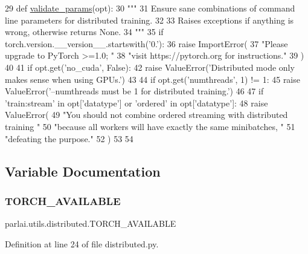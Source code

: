 \begin{DoxyCode}
29 \textcolor{keyword}{def }\hyperlink{namespaceparlai_1_1utils_1_1distributed_afd854992e4cc6571b120b9e179cd4a7a}{validate\_params}(opt):
30     \textcolor{stringliteral}{"""}
31 \textcolor{stringliteral}{    Ensure sane combinations of command line parameters for distributed training.}
32 \textcolor{stringliteral}{}
33 \textcolor{stringliteral}{    Raises exceptions if anything is wrong, otherwise returns None.}
34 \textcolor{stringliteral}{    """}
35     \textcolor{keywordflow}{if} torch.version.\_\_version\_\_.startswith(\textcolor{stringliteral}{'0.'}):
36         \textcolor{keywordflow}{raise} ImportError(
37             \textcolor{stringliteral}{"Please upgrade to PyTorch >=1.0; "}
38             \textcolor{stringliteral}{"visit https://pytorch.org for instructions."}
39         )
40 
41     \textcolor{keywordflow}{if} opt.get(\textcolor{stringliteral}{'no\_cuda'}, \textcolor{keyword}{False}):
42         \textcolor{keywordflow}{raise} ValueError(\textcolor{stringliteral}{'Distributed mode only makes sense when using GPUs.'})
43 
44     \textcolor{keywordflow}{if} opt.get(\textcolor{stringliteral}{'numthreads'}, 1) != 1:
45         \textcolor{keywordflow}{raise} ValueError(\textcolor{stringliteral}{'--numthreads must be 1 for distributed training.'})
46 
47     \textcolor{keywordflow}{if} \textcolor{stringliteral}{'train:stream'} \textcolor{keywordflow}{in} opt[\textcolor{stringliteral}{'datatype'}] \textcolor{keywordflow}{or} \textcolor{stringliteral}{'ordered'} \textcolor{keywordflow}{in} opt[\textcolor{stringliteral}{'datatype'}]:
48         \textcolor{keywordflow}{raise} ValueError(
49             \textcolor{stringliteral}{"You should not combine ordered streaming with distributed training "}
50             \textcolor{stringliteral}{"because all workers will have exactly the same minibatches, "}
51             \textcolor{stringliteral}{"defeating the purpose."}
52         )
53 
54 
\end{DoxyCode}


\subsection{Variable Documentation}
\mbox{\label{namespaceparlai_1_1utils_1_1distributed_af99c57e9c67ff88f4802625436fc2c6c}} 
\subsubsection{\texorpdfstring{T\+O\+R\+C\+H\+\_\+\+A\+V\+A\+I\+L\+A\+B\+LE}{TORCH\_AVAILABLE}}
{\footnotesize\ttfamily parlai.\+utils.\+distributed.\+T\+O\+R\+C\+H\+\_\+\+A\+V\+A\+I\+L\+A\+B\+LE}



Definition at line 24 of file distributed.\+py.

